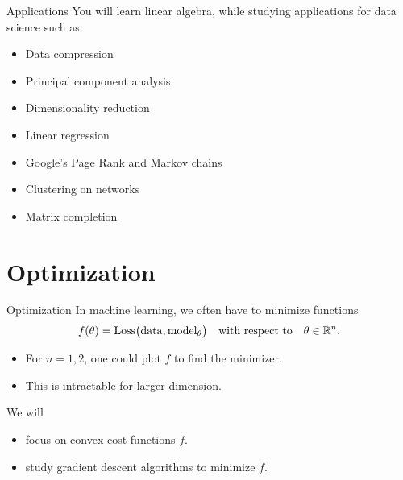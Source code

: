 \documentclass{beamer}
\begin{document}
\begin{frame}{Applications}
	You will learn linear algebra, while studying applications for data science such as:
	\vspace{0.2cm}
	\begin{itemize}
		\item Data compression 
		\item Principal component analysis 
		\item Dimensionality reduction 
		\item Linear regression 
		\item Google's Page Rank and Markov chains 
		\item Clustering on networks
		\item Matrix completion
	\end{itemize}
\end{frame}


\section{Optimization}
\begin{frame}[t]{Optimization}
	In machine learning, we often have to minimize functions
	$$
	f(\theta) = {\rm Loss}\big( {\rm data}, {\rm model}_{\theta}\big)
	\quad \text{with respect to} \quad \theta \in \mathbb{R}^n.
	$$
	\begin{itemize}
		\item For $n=1,2$, one could plot $f$ to find the minimizer.
		\item This is intractable for larger dimension.
	\end{itemize}

	\vspace{0.2cm}
	\begin{block}{We will}
		\begin{itemize}
			\item focus on convex cost functions $f$.
			\item study gradient descent algorithms to minimize $f$.
		\end{itemize}
	\end{block}
\end{frame}
\end{document}
